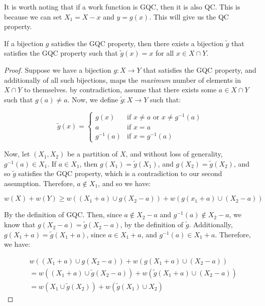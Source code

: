 It is worth noting that if a work function is GQC, then it is also QC. This is because we can set $X_1 = X-x$ and $y = g(x)$. This will give us the QC property.

\begin{lemma}
    If a bijection $g$ satisfies the GQC property, then there exists a bijection $\tilde{g}$ that satisfies the GQC property such that $\tilde{g}(x) = x$ for all $x \in X \cap Y$.
\end{lemma}
\begin{proof}
    Suppose we have a bijection $g: X \rightarrow Y$ that satisfies the GQC property, and additionally of all such bijections, maps the \textit{maximum} number of elements in $X \cap Y$ to themselves. by contradiction, assume that there exists some $a \in X \cap Y$ such that $g(a) \neq a$. Now, we define $\tilde{g}: X \rightarrow Y$ such that:
    
    \begin{equation*}
        \tilde{g}(x) = \begin{cases}
            g(x) & \text{if } x \neq a \text{ or } x \neq g^{-1}(a) \\
            a & \text{if } x = a \\
            g^{-1}(a) & \text{if } x = g^{-1}(a)
        \end{cases}
    \end{equation*}
    
    Now, let $(X_1, X_2)$ be a partition of $X$, and without loss of generality, $g^{-1}(a) \in X_1$. If $a \in X_1$, then $g(X_1) = \tilde{g}(X_1)$, and $g(X_2) = \tilde{g}(X_2)$, and so $\tilde{g}$ satisfies the GQC property, which is a contradiction to our second assumption. Therefore, $a \not\in X_1$, and so we have:

    \begin{equation*}
        w(X) + w(Y) \geq w((X_1+a) \cup g(X_2-a)) + w(g(x_1+a) \cup (X_2-a))
    \end{equation*}

    By the definition of GQC. Then, since $a\not \in X_2-a$ and $g^{-1}(a) \not \in X_2-a$, we know that $g(X_2-a) = \tilde{g}(X_2-a)$, by the definition of $\tilde{g}$. Additionally, $g(X_1+a) = \tilde{g}(X_1+a)$, since $a \in X_1 + a$, and $g^{-1}(a) \in X_1+a$. Therefore, we have: 
    
    \begin{equation*}
        \begin{split}
            & w((X_1+a) \cup g(X_2-a)) + w(g(X_1+a) \cup (X_2-a)) \\
            & = w((X_1+a) \cup \tilde{g}(X_2-a)) + w(\tilde{g}(X_1+a) \cup (X_2-a)) \\ 
            & = w(X_1 \cup \tilde{g}(X_2)) + w(\tilde{g}(X_1) \cup X_2)
        \end{split}
    \end{equation*}


\end{proof}
